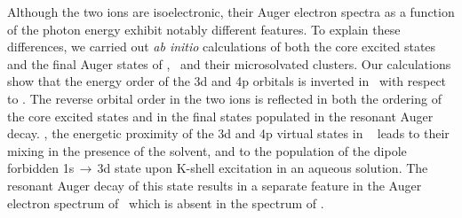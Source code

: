 Although the two ions are isoelectronic, their Auger electron spectra as a function of the photon energy exhibit notably different features. To explain these differences, we carried out {\it ab initio} calculations of both the core excited states and the final Auger states of \ki, \cli~and their microsolvated clusters. Our calculations show that the energy order of the 3d and 4p orbitals is inverted in \ki~with respect to \cli. 
%
%
The reverse orbital order in the two ions is reflected in both the ordering of the core excited states and in the final states populated in the resonant Auger decay. , the energetic proximity of the 3d and 4p virtual states in \ki~ leads to their mixing in the presence of the solvent, and to the population of the dipole forbidden 1s$\,\rightarrow\,$3d state upon K-shell excitation in an aqueous solution. The resonant Auger decay of this state results in a separate feature in the Auger electron spectrum of \ki~which is absent in the spectrum of \cli.